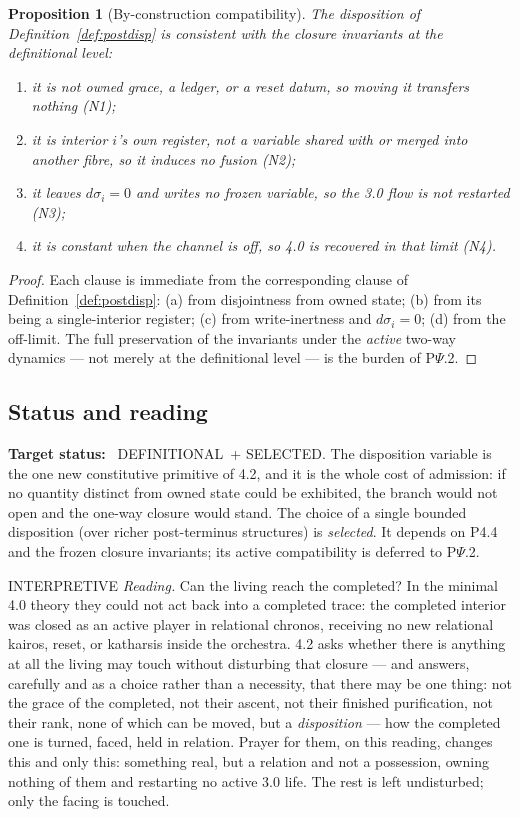 \documentclass[11pt,a4paper]{article}
\newcommand{\stDef}{\textcolor{cDef}{\textsf{\small DEFINITIONAL}}}
\newcommand{\stSelected}{\textcolor{cSel}{\textsf{\small SELECTED}}}
\newcommand{\stInterp}{\textcolor{cInt}{\textsf{\small INTERPRETIVE}}}
\theoremstyle{definition}
\theoremstyle{plain}
\newtheorem{proposition}[definition]{Proposition}
\theoremstyle{remark}
\begin{document}
\begin{proposition}[By-construction compatibility]\label{prop:psi0adm}
The disposition of Definition~\ref{def:postdisp} is consistent with the closure invariants at
the definitional level:
\begin{enumerate}[label=\textup{(\alph*)},leftmargin=1.2cm]
\item it is not owned grace, a ledger, or a reset datum, so moving it transfers nothing (N1);
\item it is interior \(i\)'s own register, not a variable shared with or merged into another
fibre, so it induces no fusion (N2);
\item it leaves \(d\sigma_i=0\) and writes no frozen variable, so the 3.0 flow is not
restarted (N3);
\item it is constant when the channel is off, so 4.0 is recovered in that limit (N4).
\end{enumerate}
\end{proposition}

\begin{proof}
Each clause is immediate from the corresponding clause of Definition~\ref{def:postdisp}:
(a) from disjointness from owned state; (b) from its being a single-interior register; (c)
from write-inertness and \(d\sigma_i=0\); (d) from the off-limit. The full preservation of the
invariants under the \emph{active} two-way dynamics --- not merely at the definitional level
--- is the burden of P$\Psi$.2. \qedhere
\end{proof}

\subsection{Status and reading}

\textbf{Target status:}~
\stDef\ + \stSelected. The disposition variable is the one new constitutive primitive of 4.2,
and it is the whole cost of admission: if no quantity distinct from owned state could be
exhibited, the branch would not open and the one-way closure would stand. The choice of a
single bounded disposition (over richer post-terminus structures) is \emph{selected}. It
depends on P4.4 and the frozen closure invariants; its active compatibility is deferred to
P$\Psi$.2.

\medskip
\stInterp\quad
\emph{Reading.}
Can the living reach the completed? In the minimal 4.0 theory they could not act back into a
completed trace: the completed interior was closed as an active player in relational chronos,
receiving no new relational kairos, reset, or katharsis inside the orchestra. 4.2 asks whether
there is anything at all the living may touch without disturbing that closure --- and answers,
carefully and as a choice rather than a necessity, that there may be one thing: not the grace
of the completed, not their ascent, not their finished purification, not their rank, none of
which can be moved, but a \emph{disposition} --- how the completed one is turned, faced, held
in relation. Prayer for them, on this reading, changes this and only this: something real, but
a relation and not a possession, owning nothing of them and restarting no active 3.0 life. The
rest is left undisturbed; only the facing is touched.
\end{document}
